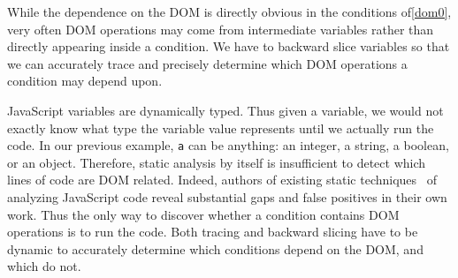 While the dependence on the DOM is directly obvious in the conditions of\autoref{dom0}, very often DOM operations may come from intermediate variables rather than directly appearing inside a condition.  
We have to backward slice variables so that we can accurately trace and precisely determine which DOM operations a condition may depend upon.  

JavaScript variables are dynamically typed.  Thus given a variable, we would not exactly know what type the variable value represents until we actually run the code.  
In our previous example, {\tt a} can be anything: an integer, a string, a boolean, or an object.  
Therefore, static analysis by itself is insufficient to detect which lines of code are DOM related.  
Indeed, authors of existing static techniques~\cite{staticJsWWW09, staticJsWWW11} of analyzing JavaScript code reveal substantial gaps and false positives in their own work.  
Thus the only way to discover whether a condition contains DOM operations is to run the code.  
Both tracing and backward slicing have to be dynamic to accurately determine which conditions depend on the DOM, and which do not.  



